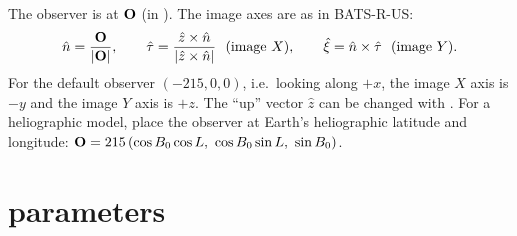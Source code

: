 The observer is at $\mathbf{O}$ (in \rsun). The image axes are as in BATS-R-US:
\[
  \hat n=\frac{\vect O}{|\vect O|},\qquad
  \hat\tau=\frac{\hat z\times\hat n}{|\hat z\times\hat n|}\ \ (\text{image }X),\qquad
  \hat\xi=\hat n\times\hat\tau\ \ (\text{image }Y).
\]
For the default observer $(-215,0,0)$, i.e.\ looking along $+x$, the image $X$ axis is
$-y$ and the image $Y$ axis is $+z$. The ``up'' vector $\hat z$ can be changed with
. For a heliographic model, place the observer at Earth's heliographic latitude
and longitude: $\vect O = 215\,(\cos B_0\cos L,\ \cos B_0\sin L,\ \sin B_0)$.

\section{ parameters}

